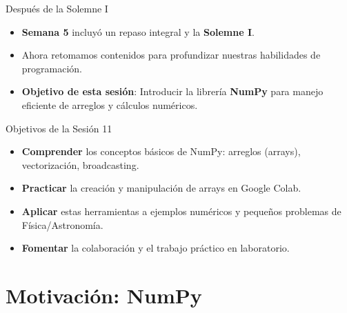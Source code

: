 \documentclass[10pt]{beamer}
\begin{document}
\begin{frame}{Después de la Solemne I}
  \begin{itemize}
    \item \textbf{Semana 5} incluyó un repaso integral y la \textbf{Solemne I}.
    \item Ahora retomamos contenidos para profundizar nuestras habilidades de programación.
    \item \textbf{Objetivo de esta sesión}: Introducir la librería \textbf{NumPy} para manejo eficiente de arreglos y cálculos numéricos.
  \end{itemize}
\end{frame}

\begin{frame}{Objetivos de la Sesión 11}
  \begin{itemize}
    \item \textbf{Comprender} los conceptos básicos de NumPy: arreglos (arrays), vectorización, broadcasting.
    \item \textbf{Practicar} la creación y manipulación de arrays en Google Colab.
    \item \textbf{Aplicar} estas herramientas a ejemplos numéricos y pequeños problemas de Física/Astronomía.
    \item \textbf{Fomentar} la colaboración y el trabajo práctico en laboratorio.
  \end{itemize}
\end{frame}

\section{Motivación: NumPy}
\end{document}
